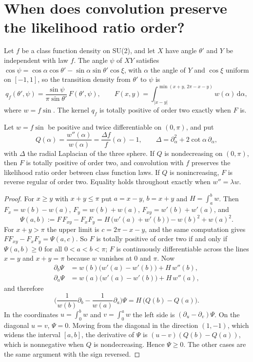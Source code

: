 \section{When does convolution preserve the likelihood ratio order?}

Let $f$ be a class function density on SU(2), and let $X$ have angle $\theta'$ and $Y$ be independent with law $f$. The angle $\psi$ of $XY$ satisfies $\cos\psi=\cos\alpha\cos\theta'-\sin\alpha\sin\theta'\cos\xi$, with $\alpha$ the angle of $Y$ and $\cos\xi$ uniform on $[-1,1]$, so the transition density from $\theta'$ to $\psi$ is
\[
q_f(\theta',\psi)=\frac{\sin\psi}{\pi\sin\theta'}\,F(\theta',\psi),\qquad F(x,y)=\int_{|x-y|}^{\min(x+y,\,2\pi-x-y)}w(\alpha)\,\mathrm d\alpha,
\]
where $w=f\sin$.
The kernel $q_f$ is totally positive of order two exactly when $F$ is.

\begin{theorem}\label{thm:tp2}
Let $w=f\sin$ be positive and twice differentiable on $(0,\pi)$, and put
\[
Q(\alpha)=\frac{w''(\alpha)}{w(\alpha)}=\frac{\Delta f}{f}(\alpha)-1,\qquad\Delta=\partial_\alpha^2+2\cot\alpha\,\partial_\alpha ,
\]
with $\Delta$ the radial Laplacian of the three sphere. If $Q$ is nondecreasing on $(0,\pi)$, then $F$ is totally positive of order two, and convolution with $f$ preserves the likelihood ratio order between class function laws. If $Q$ is nonincreasing, $F$ is reverse regular of order two. Equality holds throughout exactly when $w''=\lambda w$.
\end{theorem}

\begin{proof}
For $x\ge y$ with $x+y\le\pi$ put $a=x-y$, $b=x+y$ and $H=\int_a^bw$. Then $F_x=w(b)-w(a)$, $F_y=w(b)+w(a)$, $F_{xy}=w'(b)+w'(a)$, and
\[
\Psi(a,b):=F\,F_{xy}-F_xF_y=H\,\big(w'(a)+w'(b)\big)-w(b)^2+w(a)^2 .
\]
For $x+y>\pi$ the upper limit is $c=2\pi-x-y$, and the same computation gives $FF_{xy}-F_xF_y=\Psi(a,c)$. So $F$ is totally positive of order two if and only if $\Psi(a,b)\ge0$ for all $0<a<b<\pi$; $F$ is continuously differentiable across the lines $x=y$ and $x+y=\pi$ because $w$ vanishes at $0$ and $\pi$. Now
\begin{align*}
\partial_b\Psi&=w(b)\big(w'(a)-w'(b)\big)+H\,w''(b),\\
\partial_a\Psi&=w(a)\big(w'(a)-w'(b)\big)+H\,w''(a),
\end{align*}
and therefore
\[
\Big(\frac{1}{w(b)}\partial_b-\frac{1}{w(a)}\partial_a\Big)\Psi=H\,\big(Q(b)-Q(a)\big).
\]
In the coordinates $u=\int_0^bw$ and $v=\int_0^aw$ the left side is $(\partial_u-\partial_v)\Psi$. On the diagonal $u=v$, $\Psi=0$. Moving from the diagonal in the direction $(1,-1)$, which widens the interval $[a,b]$, the derivative of $\Psi$ is $(u-v)(Q(b)-Q(a))$, which is nonnegative when $Q$ is nondecreasing. Hence $\Psi\ge0$. The other cases are the same argument with the sign reversed.
\end{proof}

